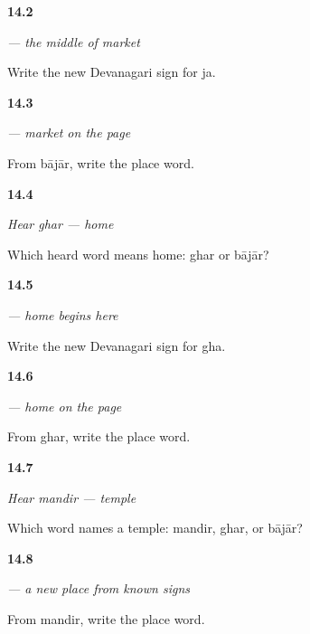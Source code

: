 \noindent\begin{minipage}[t]{\linewidth}
\raggedright
\hypertarget{review-MW-W10-ja-write}{\textbf{14.2}} \emph{ — the middle of market}\par
\small Write the new Devanagari sign for ja.
\end{minipage}\par\medskip

\noindent\begin{minipage}[t]{\linewidth}
\raggedright
\hypertarget{review-MW-C10-bajar-dictation}{\textbf{14.3}} \emph{ — market on the page}\par
\small From bājār, write the place word.
\end{minipage}\par\medskip

\noindent\begin{minipage}[t]{\linewidth}
\raggedright
\hypertarget{review-MW-C10-hear-ghar-meaning}{\textbf{14.4}} \emph{Hear \emph{ghar} — home}\par
\small Which heard word means home: ghar or bājār?
\end{minipage}\par\medskip

\noindent\begin{minipage}[t]{\linewidth}
\raggedright
\hypertarget{review-MW-W10-gha-write}{\textbf{14.5}} \emph{ — home begins here}\par
\small Write the new Devanagari sign for gha.
\end{minipage}\par\medskip

\noindent\begin{minipage}[t]{\linewidth}
\raggedright
\hypertarget{review-MW-C10-ghar-dictation}{\textbf{14.6}} \emph{ — home on the page}\par
\small From ghar, write the place word.
\end{minipage}\par\medskip

\noindent\begin{minipage}[t]{\linewidth}
\raggedright
\hypertarget{review-MW-C10-hear-mandir-meaning}{\textbf{14.7}} \emph{Hear \emph{mandir} — temple}\par
\small Which word names a temple: mandir, ghar, or bājār?
\end{minipage}\par\medskip

\noindent\begin{minipage}[t]{\linewidth}
\raggedright
\hypertarget{review-MW-C10-mandir-dictation}{\textbf{14.8}} \emph{ — a new place from known signs}\par
\small From mandir, write the place word.
\end{minipage}\par\medskip

